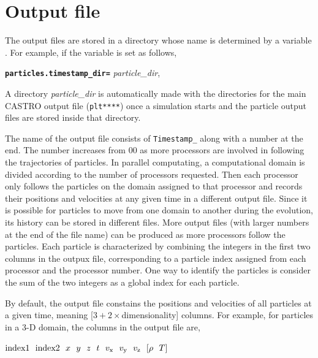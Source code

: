 \section{Output file}
\label{particles:output_file}
\noindent The output files are stored in a directory whose name is determined by a variable \\
. For example, if the variable is set as follows,

\vspace{0.1in}
{\tt  {\bf particles.timestamp\_dir=}} {\em particle\_dir},
\vspace{0.1in}

\noindent A directory {\em particle\_dir} is automatically made with the directories for the main CASTRO output file ({\tt plt****}) once a simulation starts and the particle output files are stored inside that directory.

\vspace{0.05in}
\noindent The name of the output file consists of {\tt Timestamp\_} along with a number at the end. The number increases from 00 as more processors are involved in following the trajectories of particles. In parallel computating, a computational domain is divided according to the number of processors requested. Then each processor only follows the particles on the domain assigned to that processor and records their positions and velocities at any given time in a different output file. Since it is possible for particles to move from one domain to another during the evolution, its history can be stored in different files. More output files (with larger numbers at the end of the file name) can be produced as more processors follow the particles. Each particle is characterized by combining the integers in the first two columns in the outpux file, corresponding to a particle index assigned from each processor and the processor number. One way to identify the particles is consider the sum of the two integers as a global index for each particle. 

\vspace{0.05in}
\noindent By default, the output file constains the positions and velocities of all particles at a given time, meaning [$3+ 2\times$dimensionality] columns. For example, for particles in a 3-D domain, the columns in the output file are, 

\vspace{0.1in}
${\rm index1}~~{\rm index2}~~x~~ y~~ z~~ t~~ v_{\rm x} ~~v_{\rm y}~~ v_{\rm z}~~ [\rho ~~ T]$
\vspace{0.1in}

